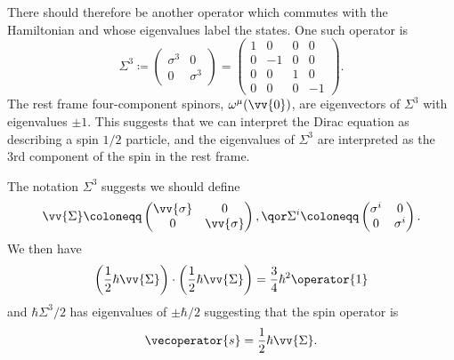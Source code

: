 \documentclass[fleqn]{NotesClass}
\begin{document}
\begin{appendices}
        There should therefore be another operator which commutes with the Hamiltonian and whose eigenvalues label the states.
        One such operator is
        \begin{equation}
            \Sigma^3 \coloneqq
            \begin{pmatrix}
                \sigma^3 & 0\\
                0 & \sigma^3
            \end{pmatrix}
            = 
            \begin{pmatrix}
                1 & 0 & 0 & 0\\
                0 & -1 & 0 & 0\\
                0 & 0 & 1 & 0\\
                0 & 0 & 0 & -1
            \end{pmatrix}
            .
        \end{equation}
        The rest frame four-component spinors, \(\omega^\mu(\vv{0})\), are eigenvectors of \(\Sigma^3\) with eigenvalues \(\pm 1\).
        This suggests that we can interpret the Dirac equation as describing a spin \(1/2\) particle, and the eigenvalues of \(\Sigma^3\) are interpreted as the 3rd component of the spin in the rest frame.
        
        The notation \(\Sigma^3\) suggests we should define
        \begin{equation}
            \vv{\Sigma} \coloneqq 
            \begin{pmatrix}
                \vv{\sigma} & 0\\
                0 & \vv{\sigma}
            \end{pmatrix}
            , \qor \Sigma^i \coloneqq
            \begin{pmatrix}
                \sigma^i & 0\\
                0 & \sigma^i
            \end{pmatrix}
            .
        \end{equation}
        We then have
        \begin{equation}
            \left( \frac{1}{2}\hbar \vv{\Sigma} \right) \cdot \left( \frac{1}{2}\hbar \vv{\Sigma} \right) = \frac{3}{4}\hbar^2 \operator{1}
        \end{equation}
        and \(\hbar\Sigma^3/2\) has eigenvalues of \(\pm \hbar/2\) suggesting that the spin operator is
        \begin{equation}
            \vecoperator{s} = \frac{1}{2}\hbar \vv{\Sigma}.
        \end{equation}
        

\end{appendices}
\end{document}

